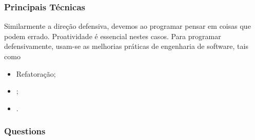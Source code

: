 \documentclass[serif,mathserif]{beamer}
\begin{document}
\begin{frame}[fragile]
  \frametitle{Principais Técnicas}
  Similarmente a direção defensiva, devemos ao programar pensar em coisas que podem errado.
  Proatividade é essencial nestes casos. Para programar defensivamente, usam-se as melhorias
práticas de engenharia de software, tais como
  \begin{itemize}
  \item Refatoração;
  \item ;
  \item .
  \end{itemize}

\end{frame}




\begin{frame}
  \frametitle{Questions}
\end{frame}
\end{document}
